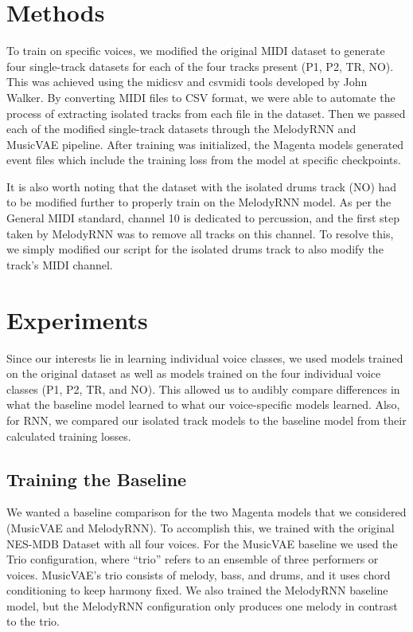 \documentclass{article}
\begin{document}
\section{Methods}

To train on specific voices, we modified the original MIDI dataset to generate four single-track datasets for each of the four tracks present (P1, P2, TR, NO). This was achieved using the midicsv and csvmidi tools developed by John Walker. By converting MIDI files to CSV format, we were able to automate the process of extracting isolated tracks from each file in the dataset. Then we passed each of the modified single-track datasets through the MelodyRNN and MusicVAE pipeline. After training was initialized, the Magenta models generated event files which include the training loss from the model at specific checkpoints.

It is also worth noting that the dataset with the isolated drums track (NO) had to be modified further to properly train on the MelodyRNN model. As per the General MIDI standard, channel 10 is dedicated to percussion, and the first step taken by MelodyRNN was to remove all tracks on this channel. To resolve this, we simply modified our script for the isolated drums track to also modify the track’s MIDI channel.



\section{Experiments}

Since our interests lie in learning individual voice classes, we used models trained on the original dataset as well as models trained on the four individual voice classes (P1, P2, TR, and NO). This allowed us to audibly compare differences in what the baseline model learned to what our voice-specific models learned. Also, for RNN, we compared our isolated track models to the baseline model from their calculated training losses.

\subsection{Training the Baseline}
We wanted a baseline comparison for the two Magenta models that we considered (MusicVAE and MelodyRNN). To accomplish this, we trained with the original NES-MDB Dataset with all four voices. For the MusicVAE baseline we used the Trio configuration, where “trio” refers to an ensemble of three performers or voices. MusicVAE’s trio consists of melody, bass, and drums, and it uses chord conditioning to keep harmony fixed. We also trained the MelodyRNN baseline model, but the MelodyRNN configuration only produces one melody in contrast to the trio.
\end{document}

